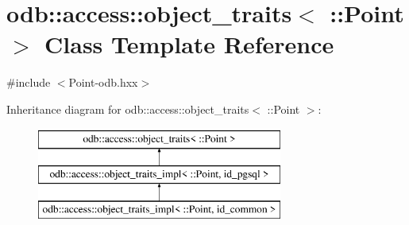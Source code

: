 \hypertarget{classodb_1_1access_1_1object__traits_3_01_1_1_point_01_4}{}\section{odb\+:\+:access\+:\+:object\+\_\+traits$<$ \+:\+:Point $>$ Class Template Reference}
\label{classodb_1_1access_1_1object__traits_3_01_1_1_point_01_4}


{\ttfamily \#include $<$Point-\/odb.\+hxx$>$}

Inheritance diagram for odb\+:\+:access\+:\+:object\+\_\+traits$<$ \+:\+:Point $>$\+:\begin{figure}[H]
\begin{center}
\leavevmode
\includegraphics[height=3.000000cm]{db/d85/classodb_1_1access_1_1object__traits_3_01_1_1_point_01_4}
\end{center}
\end{figure}
